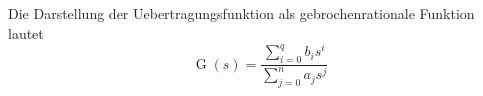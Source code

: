 Die Darstellung der Uebertragungsfunktion als gebrochenrationale Funktion lautet
$$\operatorname{G}(s) = \frac{\sum\limits_{i = 0}^{q} b_i s^i}{\sum\limits_{j = 0}^{n} a_j s^j}$$
